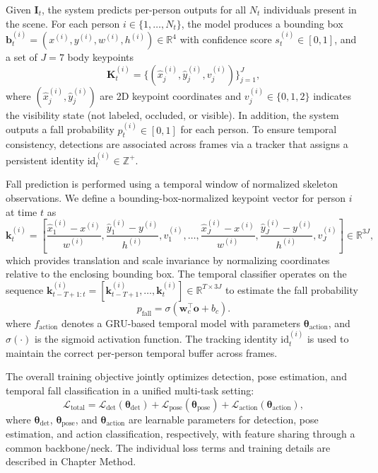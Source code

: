 Given $\mathbf{I}_t$, the system predicts per-person outputs for all $N_t$ individuals present in the scene. For each person $i \in \{1,\ldots,N_t\}$, the model produces a bounding box $\mathbf{b}_t^{(i)}=(x^{(i)}, y^{(i)}, w^{(i)}, h^{(i)}) \in \mathbb{R}^4$ with confidence score $s_t^{(i)} \in [0,1]$, and a set of $J=7$ body keypoints
\begin{equation}
\mathbf{K}_t^{(i)}=\{(\hat{x}_j^{(i)}, \hat{y}_j^{(i)}, v_j^{(i)})\}_{j=1}^{J},
\end{equation}
where $(\hat{x}_j^{(i)}, \hat{y}_j^{(i)})$ are 2D keypoint coordinates and $v_j^{(i)} \in \{0,1,2\}$ indicates the visibility state (not labeled, occluded, or visible). In addition, the system outputs a fall probability $p_t^{(i)} \in [0,1]$ for each person. To ensure temporal consistency, detections are associated across frames via a tracker that assigns a persistent identity $\mathrm{id}_t^{(i)} \in \mathbb{Z}^+$.

Fall prediction is performed using a temporal window of normalized skeleton observations. We define a bounding-box-normalized keypoint vector for person $i$ at time $t$ as
\begin{equation}
\label{eq:normalized_kp}
\mathbf{k}_t^{(i)} =
\left[
\frac{\hat{x}_1^{(i)}-x^{(i)}}{w^{(i)}},
\frac{\hat{y}_1^{(i)}-y^{(i)}}{h^{(i)}},
v_1^{(i)},
\ldots,
\frac{\hat{x}_J^{(i)}-x^{(i)}}{w^{(i)}},
\frac{\hat{y}_J^{(i)}-y^{(i)}}{h^{(i)}},
v_J^{(i)}
\right]
\in \mathbb{R}^{3J},
\end{equation}
which provides translation and scale invariance by normalizing coordinates relative to the enclosing bounding box. The temporal classifier operates on the sequence
$\mathbf{k}_{t-T+1:t}^{(i)}=[\mathbf{k}_{t-T+1}^{(i)},\ldots,\mathbf{k}_t^{(i)}]\in\mathbb{R}^{T\times 3J}$
to estimate the fall probability
\begin{equation}
    p_\text{fall} = \sigma(\mathbf{w}_c^\top \mathbf{o} + b_c).
    \label{eq:fall_prob_v1}
\end{equation}
where $f_{\text{action}}$ denotes a GRU-based temporal model with parameters $\boldsymbol{\theta}_{\text{action}}$, and $\sigma(\cdot)$ is the sigmoid activation function. The tracking identity $\mathrm{id}_t^{(i)}$ is used to maintain the correct per-person temporal buffer across frames.

The overall training objective jointly optimizes detection, pose estimation, and temporal fall classification in a unified multi-task setting:
\begin{equation}
\label{eq:total_loss}
\mathcal{L}_{\text{total}}
=
\mathcal{L}_{\text{det}}(\boldsymbol{\theta}_{\text{det}})
+
\mathcal{L}_{\text{pose}}(\boldsymbol{\theta}_{\text{pose}})
+
\mathcal{L}_{\text{action}}(\boldsymbol{\theta}_{\text{action}}),
\end{equation}
where $\boldsymbol{\theta}_{\text{det}}$, $\boldsymbol{\theta}_{\text{pose}}$, and $\boldsymbol{\theta}_{\text{action}}$ are learnable parameters for detection, pose estimation, and action classification, respectively, with feature sharing through a common backbone/neck. The individual loss terms and training details are described in Chapter Method.


